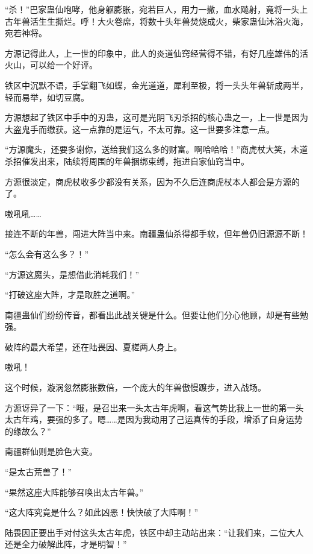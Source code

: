 
\begin{this_body}



“杀！”巴家蛊仙咆哮，他身躯膨胀，宛若巨人，用力一撤，血水飚射，竟将一头上古年兽活生生撕烂。呼！大火卷席，将数十头年兽焚烧成火，柴家蛊仙沐浴火海，宛若神将。

方源记得此人，上一世的印象中，此人的炎道仙窍经营得不错，有好几座雄伟的活火山，可以给一个好评。

铁区中沉默不语，手掌翻飞如蝶，金光道道，犀利至极，将一头头年兽斩成两半，轻而易举，如切豆腐。

方源想起了铁区中手中的刃蛊，这可是光阴飞刃杀招的核心蛊之一，上一世是因为大盗鬼手而缴获。这一点靠的是运气，不太可靠。这一世要多注意一点。

“方源魔头，还要多谢你，送给我们这么多的财富。啊哈哈哈！”商虎杖大笑，木道杀招催发出来，陆续将周围的年兽捆绑束缚，拖进自家仙窍当中。

方源很淡定，商虎杖收多少都没有关系，因为不久后连商虎杖本人都会是方源的了。

嗷吼吼……

接连不断的年兽，闯进大阵当中来。南疆蛊仙杀得都手软，但年兽仍旧源源不断！

“怎么会有这么多？！”

“方源这魔头，是想借此消耗我们！”

“打破这座大阵，才是取胜之道啊。”

南疆蛊仙们纷纷传音，都看出此战关键是什么。但要让他们分心他顾，却是有些勉强。

破阵的最大希望，还在陆畏因、夏槎两人身上。

嗷吼！

这个时候，漩涡忽然膨胀数倍，一个庞大的年兽傲慢踱步，进入战场。

方源讶异了一下：“哦，是召出来一头太古年虎啊，看这气势比我上一世的第一头太古年鸡，要强的多了。嗯……是因为我动用了己运真传的手段，增添了自身运势的缘故么？”

南疆群仙则是脸色大变。

“是太古荒兽了！”

“果然这座大阵能够召唤出太古年兽。”

“这大阵究竟是什么？如此凶恶！快快破了大阵啊！”

陆畏因正要出手对付这头太古年虎，铁区中却主动站出来：“让我们来，二位大人还是全力破解此阵，才是明智！”


\end{this_body}
